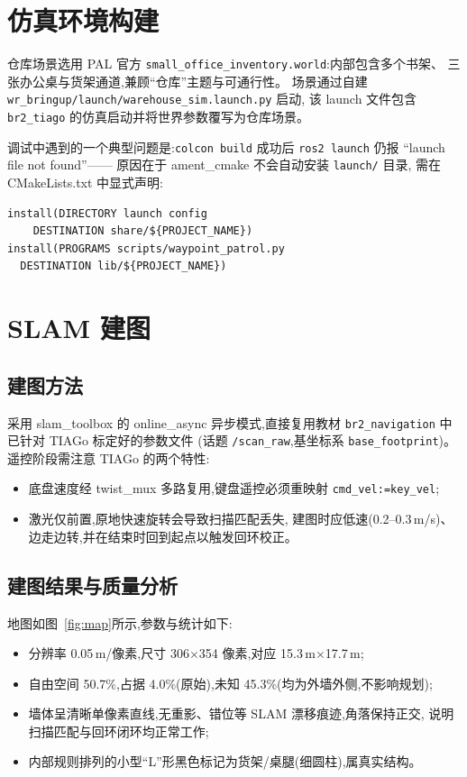 \documentclass[12pt, a4paper]{ctexart}
\begin{document}
\section{仿真环境构建}

仓库场景选用 PAL 官方 \texttt{small\_office\_inventory.world}:内部包含多个书架、
三张办公桌与货架通道,兼顾``仓库''主题与可通行性。
场景通过自建 \texttt{wr\_bringup/launch/warehouse\_sim.launch.py} 启动,
该 launch 文件包含 \texttt{br2\_tiago} 的仿真启动并将世界参数覆写为仓库场景。

调试中遇到的一个典型问题是:\texttt{colcon build} 成功后
\texttt{ros2 launch} 仍报 ``launch file not found''——
原因在于 ament\_cmake 不会自动安装 \texttt{launch/} 目录,
需在 CMakeLists.txt 中显式声明:
\begin{lstlisting}
install(DIRECTORY launch config
    DESTINATION share/${PROJECT_NAME})
install(PROGRAMS scripts/waypoint_patrol.py
  DESTINATION lib/${PROJECT_NAME})
\end{lstlisting}

\section{SLAM 建图}

\subsection{建图方法}
采用 slam\_toolbox 的 online\_async 异步模式,直接复用教材
\texttt{br2\_navigation} 中已针对 TIAGo 标定好的参数文件
(话题 \texttt{/scan\_raw},基坐标系 \texttt{base\_footprint})。
遥控阶段需注意 TIAGo 的两个特性:
\begin{itemize}
  \item 底盘速度经 twist\_mux 多路复用,键盘遥控必须重映射
        \texttt{cmd\_vel:=key\_vel};
  \item 激光仅前置,原地快速旋转会导致扫描匹配丢失,
        建图时应低速(0.2--0.3\,m/s)、边走边转,并在结束时回到起点以触发回环校正。
\end{itemize}

\subsection{建图结果与质量分析}
地图如图~\ref{fig:map}所示,参数与统计如下:
\begin{itemize}
  \item 分辨率 0.05\,m/像素,尺寸 306$\times$354 像素,对应 15.3\,m$\times$17.7\,m;
  \item 自由空间 50.7\%,占据 4.0\%(原始),未知 45.3\%(均为外墙外侧,不影响规划);
  \item 墙体呈清晰单像素直线,无重影、错位等 SLAM 漂移痕迹,角落保持正交,
        说明扫描匹配与回环闭环均正常工作;
  \item 内部规则排列的小型``L''形黑色标记为货架/桌腿(细圆柱),属真实结构。
\end{itemize}
\end{document}
